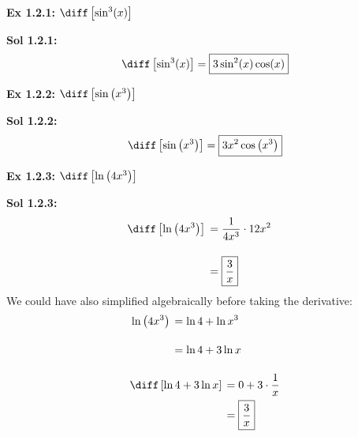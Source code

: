 \begin{tcolorbox}[example]
    \textbf{Ex 1.2.1: } $\diff \left[\sin^3 (x)\right]$ 
\end{tcolorbox}
\begin{tcolorbox}[solution]
    \textbf{Sol 1.2.1: } \begin{align*}
        \diff \left[\sin^3 (x)\right] = \boxed{3\sin^2 (x)\cos (x)}
    \end{align*} 
\end{tcolorbox} \vspace{11pt}

\begin{tcolorbox}[example]
    \textbf{Ex 1.2.2: } $\diff \left[\sin \left(x^3\right)\right]$
\end{tcolorbox}
\begin{tcolorbox}[solution]
    \textbf{Sol 1.2.2: } \begin{align*}
        \diff\left[\sin \left(x^3\right)\right] = \boxed{3x^2\cos  \left(x^3\right)}
    \end{align*}
\end{tcolorbox} \vspace{11pt}

\begin{tcolorbox}[example]
    \textbf{Ex 1.2.3: } $\diff \left[\ln \left(4x^3\right)\right]$ 
\end{tcolorbox}
\begin{tcolorbox}[solution]
    \textbf{Sol 1.2.3: } \begin{align*}
        & \diff \left[\ln \left(4x^3\right)\right] \begin{aligned}[t]
            & = \dfrac{1}{4x^3} \cdot 12x^2 \\[11pt]
            & = \boxed{\dfrac{3}{x}} 
        \end{aligned}
    \end{align*} 
    We could have also simplified algebraically before taking the derivative: \begin{align*}
        & \ln \left(4x^3\right) \begin{aligned}[t]
            & = \ln 4 + \ln x^3 \\[11pt]
            & = \ln 4 + 3\ln x 
        \end{aligned} \\[11pt]
        & \diff \left[\ln 4 + 3\ln x\right] \begin{aligned}[t]
            & = 0 + 3 \cdot \dfrac{1}{x} \\
            & = \boxed{\dfrac{3}{x}}
        \end{aligned}
    \end{align*}
\end{tcolorbox}

